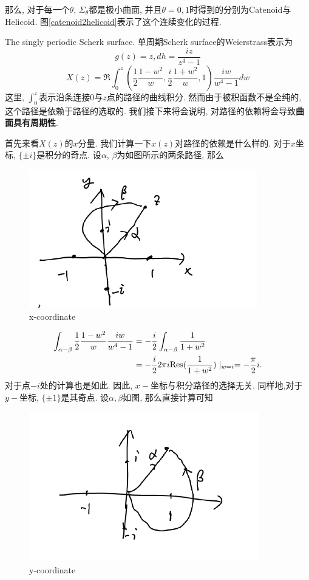 那么, 对于每一个$\theta$, $\Sigma_\theta$都是极小曲面, 并且$\theta=0,1$时得到的分别为Catenoid与Helicoid.  图\eqref{catenoid2helicoid}表示了这个连续变化的过程.
\par The singly periodic Scherk surface.  单周期Scherk surface的Weierstrass表示为
\begin{equation*}
    g(z)=z, dh=\frac{iz}{z^4-1}
\end{equation*}
\begin{equation*}
    X(z)=\Re \int^z_0(\frac{1}{2}\frac{1-w^2}{w}, \frac{i}{2}\frac{1+w^2}{w},1)\frac{iw}{w^4-1}dw
\end{equation*}
这里, $\int^z_0$表示沿条连接$0$与$z$点的路径的曲线积分. 然而由于被积函数不是全纯的, 这个路径是依赖于路径的选取的.  我们接下来将会说明, 对路径的依赖将会导致\textbf{曲面具有周期性}.
\par 首先来看$X(z)$的$x$分量. 我们计算一下$x(z)$对路径的依赖是什么样的.  对于$x$坐标, $\{\pm i\}$是积分的奇点. 设$\alpha$, $\beta$为如图所示的两条路径, 那么
\begin{figure}[ht]
    \centering
    \includegraphics[scale=0.8]{images/scherk_x.png}
    \caption{x-coordinate}
    \label{scherk_x}
\end{figure}
\begin{equation}
    \begin{split}
        \int_{\alpha- \beta} \frac{1}{2}\frac{1-w^2}{w} \frac{iw}{w^4-1} &= -\frac{i}{2}\int_{\alpha-\beta} \frac{1}{1+w^2} \\
        &=-\frac{i}{2}2\pi i {\text{Res}}(\frac{1}{1+w^2})\mid_{w=i} =-\frac{\pi}{2}i.
    \end{split}
\end{equation}
对于点$-i$处的计算也是如此. 因此, $x-$坐标与积分路径的选择无关. 同样地,对于$y-$坐标, $\{\pm 1\}$是其奇点. 设$\alpha, \beta$如图, 那么直接计算可知
\begin{figure}[ht]
    \centering
    \includegraphics[scale=0.8]{images/scherk_y.png}
    \caption{y-coordinate}
    \label{scherk_y}
\end{figure}
